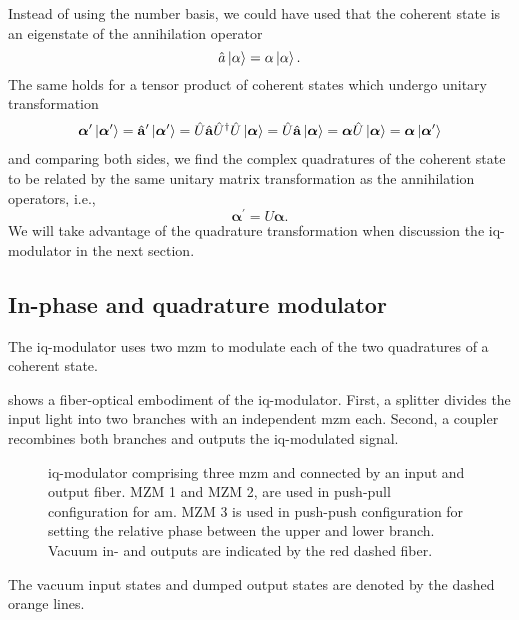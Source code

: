 Instead of using the number basis, we could have used that the coherent state is an eigenstate of the annihilation operator
\begin{equation}
	\hat{a}
	\ket{\alpha}
	=
	\alpha
	\ket{\alpha}
	.
\end{equation}
The same holds for a tensor product of coherent states which undergo unitary transformation
\begin{equation}
	\begin{split}
		\boldsymbol{\alpha}^\prime
		\ket{\boldsymbol{\alpha}^\prime}
		=
		\hat{\vb{a}}^\prime
		\ket{\boldsymbol{\alpha}^\prime}
		=
		\hat{U}
		\hat{\vb{a}}
		\hat{U}^\dagger
		\hat{U}
		\ket{\boldsymbol{\alpha}}
		=
		\hat{U}
		\hat{\vb{a}}
		\ket{\boldsymbol{\alpha}}
		=
		\boldsymbol{\alpha}
		\hat{U}
		\ket{\boldsymbol{\alpha}}
		=
		\boldsymbol{\alpha}
		\ket{\boldsymbol{\alpha}^\prime}
	\end{split}
\end{equation}
and comparing both sides, we find the complex quadratures of the coherent state to be related by the same unitary matrix transformation as the annihilation operators, i.e.,
\begin{equation}
	\boldsymbol{\alpha}^\prime
	=
	U
	\boldsymbol{\alpha}
	.
\end{equation}
We will take advantage of the quadrature transformation when discussion the \gls{iq}-modulator in the next section.

\subsection{In-phase and quadrature modulator}

The \gls{iq}-modulator uses two \gls{mzm} to modulate each of the two quadratures of a coherent state.

 shows a fiber-optical embodiment of the \gls{iq}-modulator.
First, a splitter divides the input light into two branches with an independent \gls{mzm} each.
Second, a coupler recombines both branches and outputs the \gls{iq}-modulated signal.
\begin{figure}[htb]
	\centering
	
	\caption{\gls{iq}-modulator comprising three \gls{mzm} and connected by an input and output fiber. MZM 1 and MZM 2, are used in push-pull configuration for \gls{am}. MZM 3 is used in push-push configuration for setting the relative phase between the upper and lower branch. Vacuum in- and outputs are indicated by the red dashed fiber.}\label{fig:iqm}
\end{figure}
The vacuum input states and dumped output states are denoted by the dashed orange lines.

